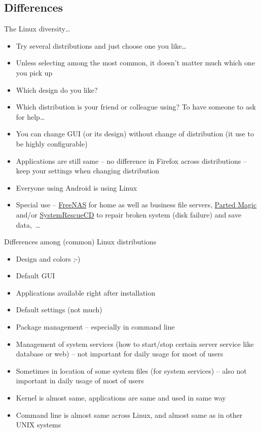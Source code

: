 \documentclass[compress, ucs, xelatex, 11pt, xcolor=svgnames,
  hyperref={
    bookmarks=true,
    unicode=true,
    colorlinks=true,
    pdftitle={Linux, command line and MetaCentrum},
    plainpages=false,
    pdfauthor={Vojtech Zeisek},
    pdfsubject={Course about use of Linux command line, writing shell scripts and using MetaCentrum of CESNET},
    pdfcreator={XeLaTeX},
    pdfkeywords={Linux, GNU, BASH, shell, command line, MetaCentrum},
    linkcolor=DarkRed,
    anchorcolor=DarkBlue,
    citecolor=Indigo,
    filecolor=NavyBlue,
    menucolor=DarkMagenta,
    urlcolor=DarkBlue,
    pdftex},
  url={hyphens, lowtilde} %
  ]{beamer}
\begin{document}
\subsection{Differences}

\begin{frame}{The Linux diversity\ldots}
  \begin{itemize}
    \item Try several distributions and just choose one you like\ldots
    \item Unless selecting among the most common, it doesn't matter much which one you pick up
    \item Which design do you like?
    \item Which distribution is your friend or colleague using? To have someone to ask for help\ldots
    \item You can change GUI (or its design) without change of distribution (it use to be highly configurable)
    \item Applications are still same -- no difference in Firefox across distributions -- keep your settings when changing distribution
    \item Everyone using Android is using Linux
    \item Special use -- \href{http://www.freenas.org/}{FreeNAS} for home as well as business file servers, \href{https://partedmagic.com/}{Parted Magic} and/or \href{https://www.system-rescue-cd.org/SystemRescueCd_Homepage}{SystemRescueCD} to repair broken system (disk failure) and save data,~\ldots
  \end{itemize}
\end{frame}

\begin{frame}{Differences among (common) Linux distributions}
  \begin{itemize}
    \item Design and colors ;-)
    \item Default GUI
    \item Applications available right after installation
    \item Default settings (not much)
    \item Package management -- especially in command line
    \item Management of system services (how to start/stop certain server service like database or web) -- not important for daily usage for most of users
    \item Sometimes in location of some system files (for system services) -- also not important in daily usage of most of users
    \item Kernel is almost same, applications are same and used in same way
    \item Command line is almost same across Linux, and almost same as in other UNIX systems
  \end{itemize}
\end{frame}
\end{document}

